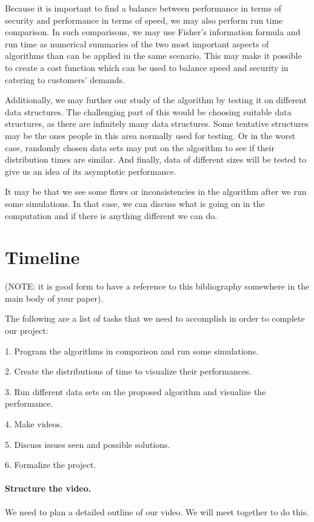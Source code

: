 \documentclass[11pt,twocolumn]{article}
\begin{document}
Because it is important to find a balance between performance in terms of security and performance in terms of speed, we may also perform run time comparison. In such comparisons, we may use Fisher's information formula and run time as numerical summaries of the two most important aspects of algorithms than can be applied in the same scenario. This may make it possible to create a cost function which can be used to balance speed and security in catering to customers' demands. 

Additionally, we may further our study of the algorithm by testing it on different data structures. The challenging part of this would be choosing suitable data structures, as there are infinitely many data structures. Some tentative structures may be the ones people in this area normally used for testing. Or in the worst case, randomly chosen data sets may put on the algorithm to see if their distribution times are similar. And finally, data of different sizes will be tested to give us an idea of its asymptotic performance. 

It may be that we see some flaws or inconsistencies in the algorithm after we run some simulations. In that case, we can discuss what is going on in the computation and if there is anything different we can do.



 

\newpage
\onecolumn
\appendix
\section{Timeline}
(NOTE: it is good form to have a reference to this bibliography somewhere in 
the main body of your paper).

The following are a list of tasks that we need to accomplish in order to 
complete our project:

1. Program the algorithms in comparison and run some simulations.

2. Create the distributions of time to visualize their performances.

3. Run different data sets on the proposed algorithm and visualize the performance.

4. Make videos.

5. Discuss issues seen and possible solutions.

6. Formalize the project.

\paragraph{Structure the video.} We need to plan a detailed outline of our 
video.  We will meet together to do this.
\end{document}
